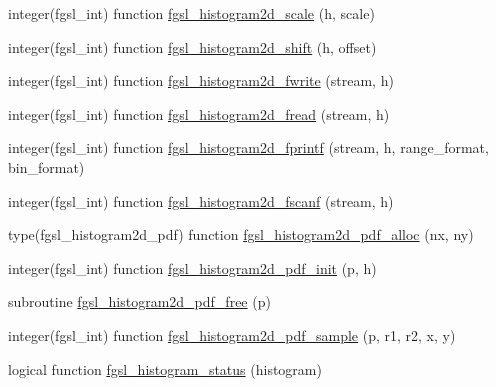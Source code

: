 \begin{DoxyCompactItemize}
\item 
integer(fgsl\-\_\-int) function \hyperlink{histogram_8finc_aa3e922748f78a89e60704fd558b87bb4}{fgsl\-\_\-histogram2d\-\_\-scale} (h, scale)
\item 
integer(fgsl\-\_\-int) function \hyperlink{histogram_8finc_a525495f254a07ea2349b86f78102433f}{fgsl\-\_\-histogram2d\-\_\-shift} (h, offset)
\item 
integer(fgsl\-\_\-int) function \hyperlink{histogram_8finc_a3ef59b4b026ab698dc81ffff9220e157}{fgsl\-\_\-histogram2d\-\_\-fwrite} (stream, h)
\item 
integer(fgsl\-\_\-int) function \hyperlink{histogram_8finc_a758daf277e6d8a5227ac3d29d2e1210c}{fgsl\-\_\-histogram2d\-\_\-fread} (stream, h)
\item 
integer(fgsl\-\_\-int) function \hyperlink{histogram_8finc_a438e52004996aea464dd46febf6bd3eb}{fgsl\-\_\-histogram2d\-\_\-fprintf} (stream, h, range\-\_\-format, bin\-\_\-format)
\item 
integer(fgsl\-\_\-int) function \hyperlink{histogram_8finc_a70db145af8c4250a8cef0ed580eda1f8}{fgsl\-\_\-histogram2d\-\_\-fscanf} (stream, h)
\item 
type(fgsl\-\_\-histogram2d\-\_\-pdf) function \hyperlink{histogram_8finc_a3c05bd287a175450294a73d0b0602f79}{fgsl\-\_\-histogram2d\-\_\-pdf\-\_\-alloc} (nx, ny)
\item 
integer(fgsl\-\_\-int) function \hyperlink{histogram_8finc_a2ab36a10d3cca3fcc3cc40e7ca494ac8}{fgsl\-\_\-histogram2d\-\_\-pdf\-\_\-init} (p, h)
\item 
subroutine \hyperlink{histogram_8finc_a08916fd4863246e82d56e495a32140fc}{fgsl\-\_\-histogram2d\-\_\-pdf\-\_\-free} (p)
\item 
integer(fgsl\-\_\-int) function \hyperlink{histogram_8finc_a49e8bf3ac9645218532bead7328c83ef}{fgsl\-\_\-histogram2d\-\_\-pdf\-\_\-sample} (p, r1, r2, x, y)
\item 
logical function \hyperlink{histogram_8finc_afed1167e78d0e89d21237ab6fca7c662}{fgsl\-\_\-histogram\-\_\-status} (histogram)
\end{DoxyCompactItemize}



